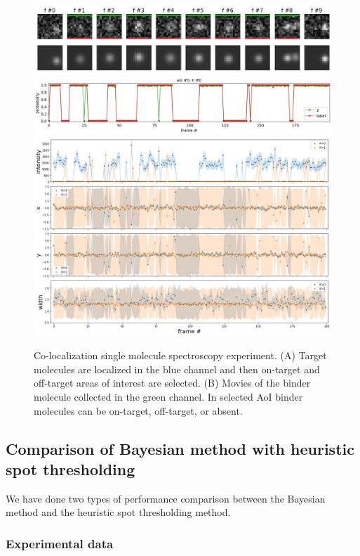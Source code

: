 \begin{figure}
\includegraphics[width=\linewidth]{figures/figure3a.png}
\includegraphics[width=\linewidth]{figures/figure3b.png}
\includegraphics[width=\linewidth]{figures/figure3c.png}
\caption{Co-localization single molecule spectroscopy experiment. (A) Target molecules are localized in the blue channel and then on-target and off-target areas of interest are selected. (B) Movies of the binder molecule collected in the green channel. In selected AoI binder molecules can be on-target, off-target, or absent.}
\label{fig:view}
\end{figure}

\subsection{Comparison of Bayesian method with heuristic spot thresholding}

We have done two types of performance comparison between the Bayesian method and the heuristic spot thresholding method.

\subsubsection{Experimental data}

